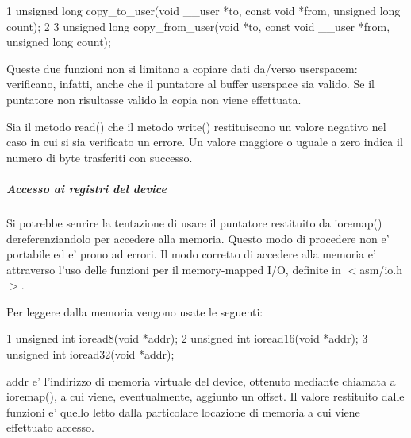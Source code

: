 \begin{DoxyCode}
1 unsigned long copy\_to\_user(void \_\_user *to, const void *from, unsigned long count);
2 
3 unsigned long copy\_from\_user(void *to, const void \_\_user *from, unsigned long count);
\end{DoxyCode}


Queste due funzioni non si limitano a copiare dati da/verso userspacem\+: verificano, infatti, anche che il puntatore al buffer userspace sia valido. Se il puntatore non risultasse valido la copia non viene effettuata.

Sia il metodo read() che il metodo write() restituiscono un valore negativo nel caso in cui si sia verificato un errore. Un valore maggiore o uguale a zero indica il numero di byte trasferiti con successo.

\subparagraph*{Accesso ai registri del device}

Si potrebbe senrire la tentazione di usare il puntatore restituito da ioremap() dereferenziandolo per accedere alla memoria. Questo modo di procedere non e' portabile ed e' prono ad errori. Il modo corretto di accedere alla memoria e' attraverso l'uso delle funzioni per il memory-\/mapped I/\+O, definite in $<$asm/io.\+h$>$.

Per leggere dalla memoria vengono usate le seguenti\+:


\begin{DoxyCode}
1 unsigned int ioread8(void *addr);
2 unsigned int ioread16(void *addr);
3 unsigned int ioread32(void *addr);
\end{DoxyCode}


addr e' l'indirizzo di memoria virtuale del device, ottenuto mediante chiamata a ioremap(), a cui viene, eventualmente, aggiunto un offset. Il valore restituito dalle funzioni e' quello letto dalla particolare locazione di memoria a cui viene effettuato accesso.


